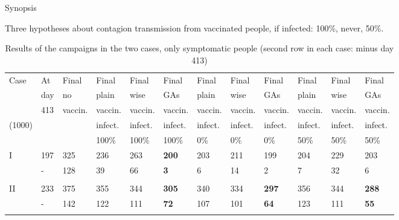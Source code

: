 \documentclass[8pt]{beamer}
\begin{document}
\begin{frame}{Synopsis}

Three hypotheses about contagion transmission from vaccinated people, if infected: 100\%, never, 50\%.

\medskip

\begin{table}[H]
\centering
\begin{scriptsize} %
\begin{tabular}{llllllllllll}
\toprule
Case    & At   & Final      & Final        & Final       & Final      & Final       & Final    & Final        & Final    & Final        & Final     \\
             & day & no         & plain       & wise        & GAs         & plain       & wise        & GAs         & plain       & wise        & GAs    \\
             & 413 & vaccin. & vaccin.    & vaccin.  & vaccin.  & vaccin.  & vaccin.  & vaccin.  & vaccin.  & vaccin.  & vaccin.  \\
 (1000) &        &              &  infect.  &  infect. &  infect. &  infect. &  infect. &  infect. &  infect. &  infect. &  infect.\\
             &       &              &  100\%   &  100\% &  100\% &  0\% &  0\% &  0\% & 50\% &  50\% &  50\% \\
\midrule
I            & 197 & 325 & 236 & 263 & \textbf{200} & 203 & 211   & 199 & 204 & 229 & 203 \\
             & -      & 128 & 39    & 66  & \textbf{3}    &  6     & 14  & 2     & 7     & 32 & 6 \\
\\
II           & 233 & 375 & 355 &  344 & \textbf{305}  & 340 & 334 & \textbf{297}  & 356 & 344 &  \textbf{288} \\
             & -      &  142 & 122 & 111 & \textbf{72}    & 107 & 101 & \textbf{64}   & 123   & 111 &  \textbf{55} \\
\\
\bottomrule  
\end{tabular}
\end{scriptsize}
\caption{Results of the campaigns in the two cases, only symptomatic people (second row in each case: minus day 413)}
\label{caseSynopsys}
\end{table}

\end{frame}
\end{document}
